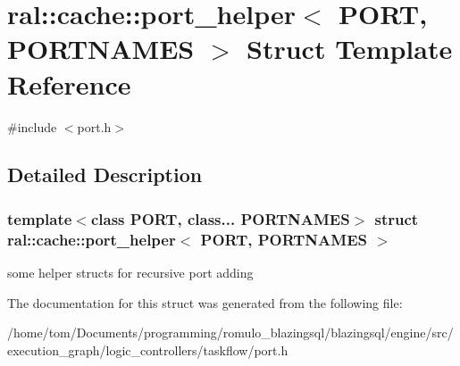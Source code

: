 \hypertarget{structral_1_1cache_1_1port__helper}{}\section{ral\+:\+:cache\+:\+:port\+\_\+helper$<$ P\+O\+RT, P\+O\+R\+T\+N\+A\+M\+ES $>$ Struct Template Reference}
\label{structral_1_1cache_1_1port__helper}


{\ttfamily \#include $<$port.\+h$>$}



\subsection{Detailed Description}
\subsubsection*{template$<$class P\+O\+RT, class... P\+O\+R\+T\+N\+A\+M\+ES$>$\newline
struct ral\+::cache\+::port\+\_\+helper$<$ P\+O\+R\+T, P\+O\+R\+T\+N\+A\+M\+E\+S $>$}

some helper structs for recursive port adding 

The documentation for this struct was generated from the following file\+:\begin{DoxyCompactItemize}
\item 
/home/tom/\+Documents/programming/romulo\+\_\+blazingsql/blazingsql/engine/src/execution\+\_\+graph/logic\+\_\+controllers/taskflow/port.\+h\end{DoxyCompactItemize}
